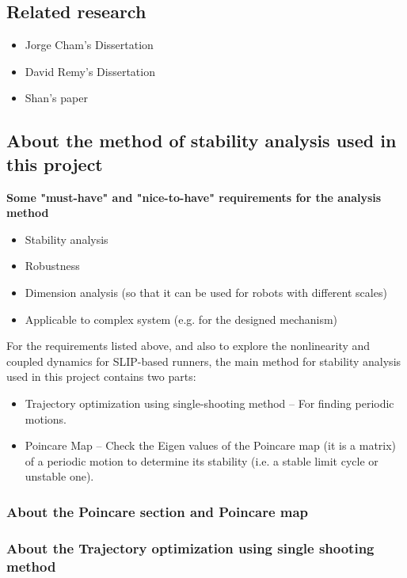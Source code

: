 \subsection{Related research}
\begin{itemize}
	\item Jorge Cham's Dissertation
	\item David Remy's Dissertation
	\item Shan's paper
\end{itemize}

\subsection{About the method of stability analysis used in this project}
\textbf{Some "must-have" and "nice-to-have" requirements for the analysis method}
\begin{itemize}
\item Stability analysis
\item Robustness
\item Dimension analysis (so that it can be used for robots with different scales)
\item Applicable to complex system (e.g. for the designed mechanism)
\end{itemize}

For the requirements listed above, and also to explore the nonlinearity and coupled dynamics for SLIP-based runners, the main method for stability analysis used in this project contains two parts:
\begin{itemize}
	\item Trajectory optimization using single-shooting method -- For finding periodic motions.
	\item Poincare Map -- Check the Eigen values of the Poincare map (it is a matrix) of a periodic motion to determine its stability (i.e. a stable limit cycle or unstable one).
\end{itemize}


\subsubsection{About the Poincare section and Poincare map}

\subsubsection{About the Trajectory optimization using single shooting method}

